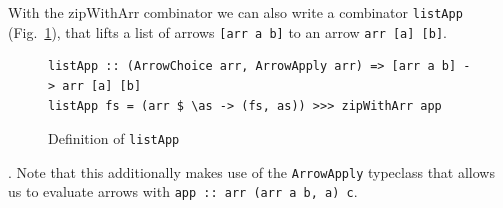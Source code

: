 \documentclass{jfp1}
\newcommand{\inlinecode}[1]{\texttt{#1}}
\begin{document}
With the zipWithArr combinator we can also write a combinator \inlinecode{listApp} (Fig.~\ref{fig:listApp}), that lifts a list of arrows \inlinecode{[arr a b]} to an arrow \inlinecode{arr [a] [b]}.
\begin{figure}[h]
\begin{lstlisting}[frame=htrbl]
listApp :: (ArrowChoice arr, ArrowApply arr) => [arr a b] -> arr [a] [b]
listApp fs = (arr $ \as -> (fs, as)) >>> zipWithArr app
\end{lstlisting}
\caption{Definition of \inlinecode{listApp}}
\label{fig:listApp}
\end{figure}
. Note that  this additionally makes use of the \inlinecode{ArrowApply} typeclass that allows us to evaluate arrows with \inlinecode{app :: arr (arr a b, a) c}.



\end{document}
